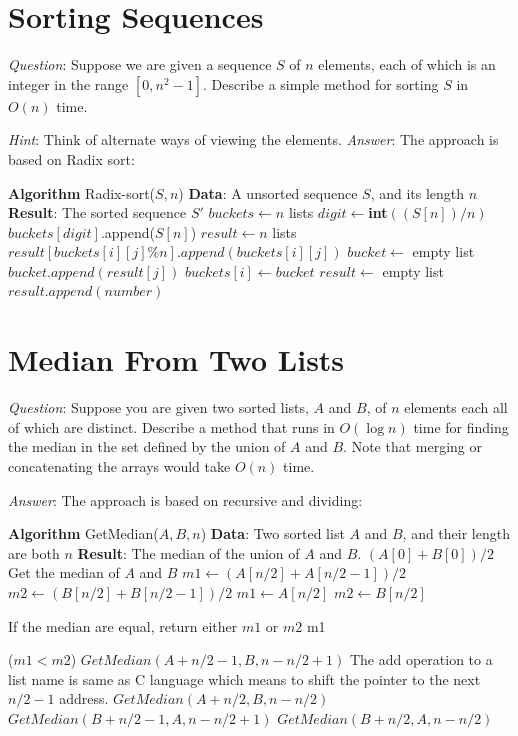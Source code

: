 \documentclass[11pt]{article}
\begin{document}
\section{Sorting Sequences}
\noindent \emph{Question}: Suppose we are given a sequence $S$ of $n$ elements, each of which is an integer in the range $[0,n^2-1]$. Describe a simple method for sorting $S$ in $O(n)$ time.

\noindent \emph{Hint}: Think of alternate ways of viewing the elements.
\noindent \emph{Answer}: The approach is based on Radix sort:
\begin{algorithmic}
	\State \textbf{Algorithm} Radix-sort($S,n$)
	\State \textbf{Data}: A unsorted sequence $S$, and its length $n$
	\State \textbf{Result}: The sorted sequence $S'$
	\State $buckets \gets n $ lists
		\State $digit \gets $\textbf{int}$((S[n])/n)$
		\State $buckets[digit]$.append($S[n]$)
	\EndFor
		\State $result\gets n$ lists
			\State $result[buckets[i][j]\%n].append(buckets[i][j])$
		\EndFor
		\State $bucket\gets$ empty list
			\State $bucket.append(result[j])$
		\EndFor
		\State $buckets[i]\gets bucket$
	\EndFor
	\State $result \gets$ empty list
			\State $result.append(number)$
		\EndFor
	\EndFor
\end{algorithmic}
\section{Median From Two Lists}
\noindent \emph{Question}: Suppose you are given two sorted lists, $A$ and $B$, of $n$ elements each all of which are distinct. Describe a method that runs in $O(\log n)$ time for finding the median in the set defined by the union of $A$ and $B$. Note that merging or concatenating the arrays would take $O(n)$ time.

\noindent \emph{Answer}: The approach is based on recursive and dividing:
\begin{algorithmic}
	\State \textbf{Algorithm} GetMedian($A,B,n$)
	\State \textbf{Data}: Two sorted list $A$ and $B$, and their length are both $n$
	\State \textbf{Result}: The median of the union of $A$ and $B$.
		\State \Return $(A[0]+B[0])/2$
	\EndIf
	 \Comment Get the median of $A$ and $B$
		\State $m1\gets (A[n/2]+A[n/2-1])/2$
		\State $m2\gets (B[n/2]+B[n/2-1])/2$
	\Else
		\State $m1\gets A[n/2]$
		\State $m2\gets B[n/2]$
	\EndIf
	
	 \Comment If the median are equal, return either $m1$ or $m2$
		\State \Return m1
	\EndIf
	
	\If($m1 < m2$)
			\State \Return $GetMedian(A+n/2-1,B,n-n/2+1)$ \Comment The add operation to a list name is same as C language which means to shift the pointer to the next $n/2-1$ address.
		\Else
			\State \Return $GetMedian(A+n/2,B,n-n/2)$
		\EndIf
	\Else
			\State \Return $GetMedian(B+n/2-1,A,n-n/2+1)$
		\Else
			\State \Return $GetMedian(B+n/2,A,n-n/2)$
		\EndIf
	\EndIf
\end{algorithmic}
\end{document}
